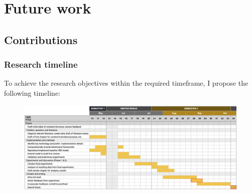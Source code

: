 \documentclass[8pt]{beamer}
\begin{document}

\section{Future work}

\subsection{Contributions}

\begin{frame}
\frametitle{Research timeline}

To achieve the research objectives within the required timeframe, I propose the following timeline:

\begin{figure}[htbp]
   \centering
   \begin{adjustbox}{center}
   \includegraphics[width=12cm]{figs/mcs-pres-research-timeline.png} 
   \end{adjustbox}
   
\end{figure}

\end{frame}

\end{document}
